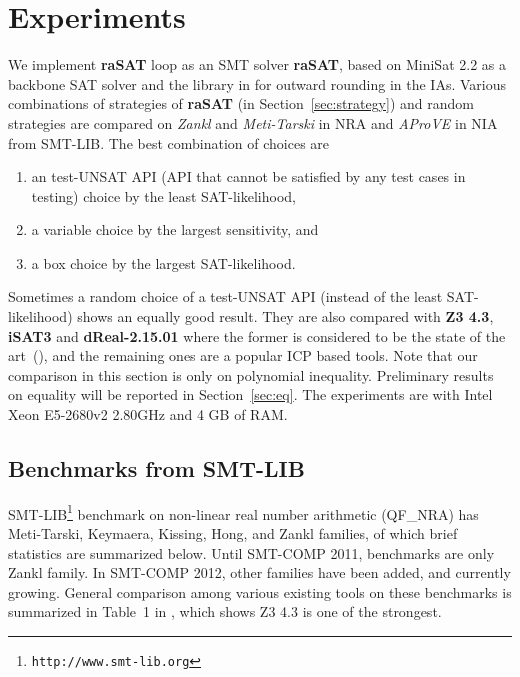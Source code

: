 \documentclass[runningheads,a4paper,oribibl]{llncs}
\begin{document}
\section{Experiments} \label{sec:experiment}

We implement \textbf{raSAT} loop as an SMT solver {\bf raSAT}, 
based on MiniSat 2.2 as a backbone SAT solver and the library in \cite{Al2012.14} for
outward rounding in the IAs. 
Various combinations of strategies of {\bf raSAT} (in Section~\ref{sec:strategy})
and random strategies are compared on {\em Zankl} and {\em Meti-Tarski} in NRA  
and {\em AProVE} in NIA  from SMT-LIB. 
The best combination of choices are 
\begin{enumerate}
\item an test-UNSAT API  (API that cannot be satisfied by any test cases in testing) choice by the least SAT-likelihood, 
\item a variable choice by the largest sensitivity, and 
\item a box choice by the largest SAT-likelihood. 
\end{enumerate} 
Sometimes a random choice of a test-UNSAT API (instead of the least SAT-likelihood) 
shows an equally good result. 
They are also compared with \textbf{Z3 4.3}, \textbf{iSAT3} and \textbf{dReal-2.15.01}
where the former is considered to be the state of the art~(\cite{Jovanovic13}), and 
the remaining ones are a popular ICP based tools. 
Note that our comparison in this section is only on polynomial inequality.
Preliminary results on equality will be reported in Section~\ref{sec:eq}. 
The experiments are with Intel Xeon E5-2680v2 2.80GHz and 4 GB of RAM. 


\subsection{Benchmarks from SMT-LIB} \label{sec:expsmtlib}

SMT-LIB\footnote{\tt http://www.smt-lib.org} 
benchmark on non-linear real number arithmetic 
(QF\_NRA) has Meti-Tarski, Keymaera, Kissing, Hong, and Zankl families,
of which brief statistics are summarized below. 
Until SMT-COMP 2011, benchmarks are only Zankl family. 
In SMT-COMP 2012, other families have been added, and currently growing. 
General comparison among various existing tools on these benchmarks is summarized in 
Table~1 in \cite{Jovanovic13}, which shows Z3 4.3 is one of the strongest. 
\end{document}
